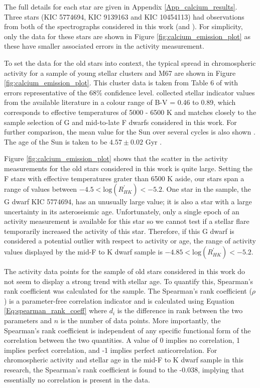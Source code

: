 The full details for each star are given in Appendix \ref{App_calcium_results}. Three stars (KIC 5774694, KIC 9139163 and KIC 10454113) had observations from both of the spectrographs considered in this work (\esp and \narval). For simplicity, only the \narval data for these stars are shown in Figure \ref{fig:calcium_emission_plot} as these have smaller associated errors in the activity measurement. 

To set the data for the old stars into context, the typical spread in chromospheric activity for a sample of young stellar clusters and M67 are shown in Figure \ref{fig:calcium_emission_plot}. This cluster data is taken from Table 6 of \citet{Mamajek_Hillenbrand_2008} with errors representative of the 68\% confidence level. \citet{Mamajek_Hillenbrand_2008} collected stellar \Rprime indicator values from the available literature in a colour range of B-V = 0.46 to 0.89, which corresponds to effective temperatures of 5000 - 6500 K and matches closely to the sample selection of G and mid-to-late F dwarfs considered in this work. For further comparison, the mean \Rprime value for the Sun over several cycles is also shown \citep{Egeland_etal_2017}. The age of the Sun is taken to be $4.57 \pm 0.02$ Gyr \citep{Bahcall_etal_1995}.

Figure \ref{fig:calcium_emission_plot} shows that the scatter in the \Rprime activity measurements for the old stars considered in this work is quite large. Setting the F stars with effective temperatures grater than 6500 K aside, our stars span a range of \Rprime values between $-4.5<\mathrm{log}(R^{'}_{HK})<-5.2$. One star in the sample, the G dwarf KIC 5774694, has an unusually large \Rprime value; it is also a star with a large uncertainty in its asteroseismic age. Unfortunately, only a single epoch of an activity measurement is available for this star so we cannot test if a stellar flare temporarily increased the activity of this star. Therefore, if this G dwarf is considered a potential outlier with respect to activity or age, the range of activity values displayed by the mid-F to K dwarf sample is $-4.85<\mathrm{log}(R^{'}_{HK})<-5.2$.

The activity data points for the sample of old stars considered in this work do not seem to display a strong trend with stellar age. To quantify this, Spearman's rank coefficient was calculated for the sample. The Spearman's rank coefficient ($\rho$) is a parameter-free correlation indicator and is calculated using Equation \ref{Eq:spearman_rank_coeff} where $d_{i}$ is the difference in rank between the two parameters and $n$ is the number of data points. More importantly, the Spearman's rank coefficient is independent of any specific functional form of the correlation between the two quantities. A value of 0 implies no correlation, 1 implies perfect correlation, and -1 implies perfect anticorrelation. For chromospheric activity and stellar age in the mid-F to K dwarf sample in this research, the Spearman's rank coefficient is found to the -0.038, implying that essentially no correlation is present in the data.


